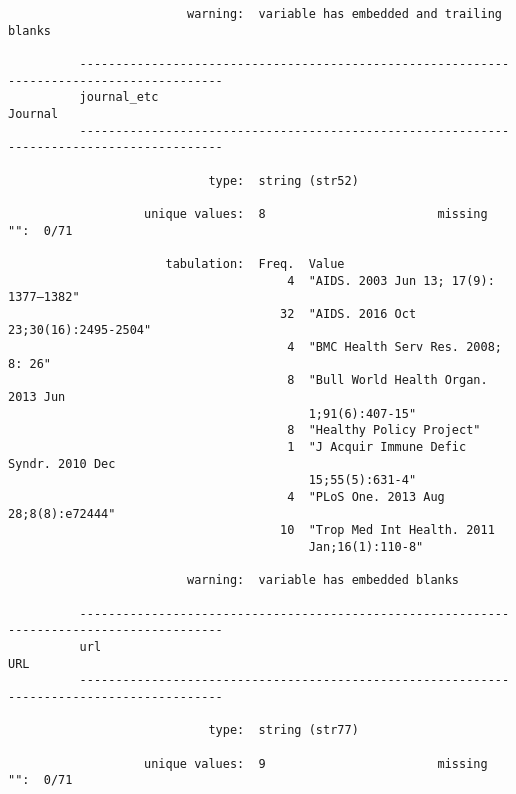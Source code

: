 \documentclass{article}
\begin{document}
\begin{verbatim}
                         warning:  variable has embedded and trailing blanks
          
          ------------------------------------------------------------------------------------------
          journal_etc                                                                        Journal
          ------------------------------------------------------------------------------------------
          
                            type:  string (str52)
          
                   unique values:  8                        missing "":  0/71
          
                      tabulation:  Freq.  Value
                                       4  "AIDS. 2003 Jun 13; 17(9): 1377–1382"
                                      32  "AIDS. 2016 Oct 23;30(16):2495-2504"
                                       4  "BMC Health Serv Res. 2008; 8: 26"
                                       8  "Bull World Health Organ. 2013 Jun
                                          1;91(6):407-15"
                                       8  "Healthy Policy Project"
                                       1  "J Acquir Immune Defic Syndr. 2010 Dec
                                          15;55(5):631-4"
                                       4  "PLoS One. 2013 Aug 28;8(8):e72444"
                                      10  "Trop Med Int Health. 2011
                                          Jan;16(1):110-8"
          
                         warning:  variable has embedded blanks
          
          ------------------------------------------------------------------------------------------
          url                                                                                    URL
          ------------------------------------------------------------------------------------------
          
                            type:  string (str77)
          
                   unique values:  9                        missing "":  0/71
          

\end{verbatim}
\end{document}
